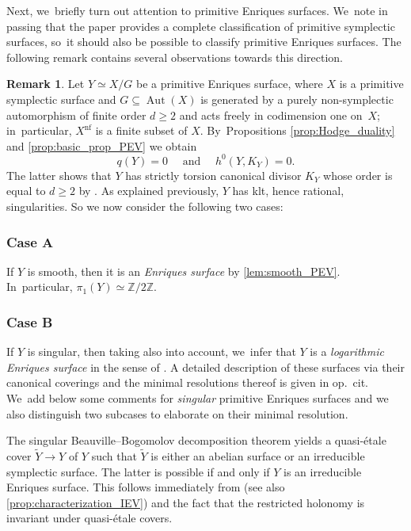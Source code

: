 \documentclass[JEP,XML,SOM,Unicode,published]{cedram}
\theoremstyle{plain}
\theoremstyle{definition}
\newtheorem{rem}[thm]{Remark}
\newcommand{\Z}{\mathbb{Z}}
\DeclareMathOperator{\Aut}{Aut}
\begin{document}
Next, we~briefly turn out attention to primitive Enriques surfaces. We~note in passing that the paper \cite{GPP24} provides a complete classification of primitive symplectic surfaces, so~it should also be possible to classify primitive Enriques surfaces. The following remark contains several observations towards this direction.

\begin{rem}
Let $Y \simeq X / G$ be a primitive Enriques surface,
where $X$ is a primitive symplectic surface and $G \subseteq \Aut(X)$ is generated by a purely non-symplectic automorphism of finite order $d \geq 2$ and acts freely in codimension one on~$X$; in~particular, $X^\mathrm{nf}$ is a finite subset of $X$. By~Propositions \ref{prop:Hodge_duality} and \ref{prop:basic_prop_PEV} we obtain
\[
q(Y) = 0 \quad \text{ and } \quad h^0(Y, K_Y) = 0.
\]
The latter shows that $Y$ has strictly torsion canonical divisor $K_Y$ whose order is equal to $d \geq 2$ by \cite[Prop.\,5.4]{BCS24}. As explained previously, $Y$ has klt, hence rational, singularities. So we now consider the following two cases:

\subsubsection*{Case A}
If $Y$ is smooth, then it is an \emph{Enriques surface} by \autoref{lem:smooth_PEV}. In~particular, $\pi_1(Y) \simeq \Z / 2\Z$.

\subsubsection*{Case B}
If $Y$ is singular, then taking \cite[Prop.\,4.18, Th.\,4.20 \& Rem.\,4.21(1)]{KM98} also into account, we~infer that $Y$ is a \emph{logarithmic Enriques surface} in the sense of \cite{Zhang91,Zhang93}.
A detailed description of these surfaces via their canonical coverings and the minimal resolutions thereof is given in op.\ cit. We~add below some comments for \emph{singular} primitive Enriques surfaces and we also distinguish two subcases to elaborate on their minimal resolution.

The singular Beauville--Bogomolov decomposition theorem \cite[Th.\,1.5]{HoerPet19} yields a quasi-étale cover $\widetilde{Y} \to Y$ of $Y$ such that $\widetilde{Y}$ is either an abelian surface or an irreducible symplectic surface. The latter is possible if and only if $Y$ is an irreducible Enriques surface. This follows immediately from \cite[Prop.\,F, (F.4)--(F.6)]{GGK19} (see also \autoref{prop:characterization_IEV}) and the fact \cite[Lem.\,4.7]{GGK19} that the restricted holonomy is invariant under quasi-étale covers.


\end{rem}
\end{document}
